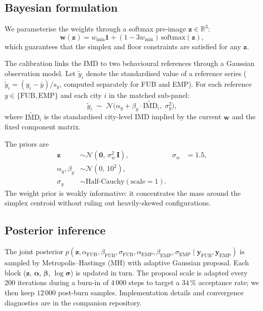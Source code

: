 \documentclass[11pt,a4paper]{article}
\newcommand{\IMD}{\mathrm{IMD}}
\begin{document}
\subsection{Bayesian formulation}

We parameterise the weights through a softmax pre-image
$\mathbf{z} \in \mathbb{R}^{3}$:
\begin{equation}
\mathbf{w}(\mathbf{z}) = w_{\min}\mathbf{1}
                       + (1 - 3 w_{\min})\,
                         \mathrm{softmax}(\mathbf{z}),
\label{eq:softmax}
\end{equation}
which guarantees that the simplex and floor constraints are
satisfied for any $\mathbf{z}$.

The calibration links the IMD to two behavioural references
through a Gaussian observation model. Let $\tilde{y}_i$ denote
the standardised value of a reference series ($\tilde{y}_i =
(y_i - \bar y) / s_y$, computed separately for FUB and EMP).
For each reference $y \in \{\text{FUB}, \text{EMP}\}$ and each
city $i$ in the matched sub-panel:
\begin{equation}
\tilde{y}_i \;\sim\;
   \mathcal{N}\!\bigl(\alpha_y + \beta_y \cdot
                       \widetilde{\IMD}_i,\; \sigma_y^{2}\bigr),
\label{eq:likelihood}
\end{equation}
where $\widetilde{\IMD}_i$ is the standardised city-level IMD
implied by the current $\mathbf{w}$ and the fixed component
matrix.

The priors are
\begin{align}
\mathbf{z}  &\sim \mathcal{N}(\mathbf{0},\, \sigma_w^{2}\,\mathbf{I}),
                  &\sigma_w &= 1.5,\\
\alpha_y, \beta_y &\sim \mathcal{N}(0,\, 10^{2}),\\
\sigma_y  &\sim \text{Half-Cauchy}(\text{scale} = 1).
\end{align}
The weight prior is weakly informative: it concentrates the
mass around the simplex centroid without ruling out
heavily-skewed configurations.

\subsection{Posterior inference}

The joint posterior $p(\mathbf{z}, \alpha_{\text{FUB}},
\beta_{\text{FUB}}, \sigma_{\text{FUB}}, \alpha_{\text{EMP}},
\beta_{\text{EMP}}, \sigma_{\text{EMP}} \mid
\mathbf{y}_{\text{FUB}}, \mathbf{y}_{\text{EMP}})$ is sampled
by Metropolis--Hastings (MH) with adaptive Gaussian proposal.
Each block ($\mathbf{z}$, $\boldsymbol{\alpha}$,
$\boldsymbol{\beta}$, $\log\boldsymbol{\sigma}$) is updated in
turn. The proposal scale is adapted every 200 iterations during
a burn-in of $4\,000$ steps to target a $34\,\%$ acceptance
rate; we then keep $12\,000$ post-burn samples. Implementation
details and convergence diagnostics are in the companion
repository.
\end{document}
